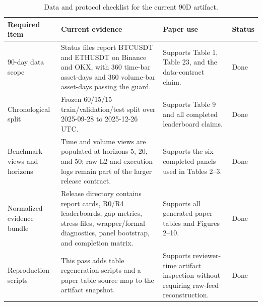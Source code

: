 \begin{table}[t]
\centering
\caption{Data and protocol checklist for the current 90D artifact.}
\label{tab:table_19_data_protocol_checklist}
\begin{tabular}{llll}
\toprule
Required item & Current evidence & Paper use & Status \\
\midrule
90-day data scope & Status files report BTCUSDT and ETHUSDT on Binance and OKX, with 360 time-bar asset-days and 360 volume-bar asset-days passing the guard. & Supports Table 1, Table 23, and the data-contract claim. & Done \\
Chronological split & Frozen 60/15/15 train/validation/test split over 2025-09-28 to 2025-12-26 UTC. & Supports Table 9 and all completed leaderboard claims. & Done \\
Benchmark views and horizons & Time and volume views are populated at horizons 5, 20, and 50; raw L2 and execution logs remain part of the larger release contract. & Supports the six completed panels used in Tables 2–3. & Done \\
Normalized evidence bundle & Release directory contains report cards, R0/R4 leaderboards, gap metrics, stress files, wrapper/formal diagnostics, panel bootstrap, and completion matrix. & Supports all generated paper tables and Figures 2–10. & Done \\
Reproduction scripts & This pass adds table regeneration scripts and a paper table source map to the artifact snapshot. & Supports reviewer-time artifact inspection without requiring raw-feed reconstruction. & Done \\
\bottomrule
\end{tabular}
\end{table}
